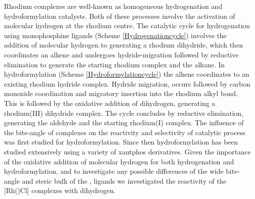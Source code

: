 Rhodium complexes are well-known as homogeneous hydrogenation and hydroformylation catalysts.  Both of these processes involve the activation of molecular hydrogen at the rhodium centre.  The catalytic cycle for hydrogenation using monophosphine ligands (Scheme \ref{Hydrogenationcycle}) involves the addition of molecular hydrogen to \ce{[Rh(PR3)2Cl]} generating a rhodium dihydride, which then coordinates an alkene and undergoes hydride-migration followed by reductive elimination to generate the starting rhodium complex and the alkane. In hydroformylation (Scheme \ref{Hydroformylationcycle}) the alkene coordinates to an existing rhodium hydride complex.  Hydride migration, occurs followed by carbon monoxide coordination and migratory insertion into the rhodium alkyl bond.  This is followed by the oxidative addition of dihydrogen, generating a rhodium(III) dihydride complex.  The cycle concludes by reductive elimination, generating the aldehyde and the starting rhodium(I) complex.  The influence of the bite-angle of \Phxantphos{} complexes on the reactivity and selectivity of catalytic process was first studied for hydroformylation.\cite{Kranenburg1995}  Since then hydroformylation has been studied extensively using a variety of xantphos derivatives.\cite{Bronger2002, Bronger2003, Bronger2004, Bronger2004b, Bronger2004c, Buhling1997, Buhling1997b, Dieleman2001, Dierkes1999, Freixa2003, Goedheijt1998b, Kamer2001, Leclercq2005, Leeuwen1999, Leeuwen2000, Mora2007, Sandee1999, Silva2003, Veen1999, Veen2000, Vlugt2004, Zuidema2007, Zuidema2008, Zuidema2010}  Given the importance of the oxidative addition of molecular hydrogen for both hydrogenation and hydroformylation, and to investigate any possible differences of the wide bite-angle and steric bulk of the \tBuxantphos{}, ligands we investigated the reactivity of the [Rh(\tBuxantphosk)Cl] complexes with dihydrogen.  

